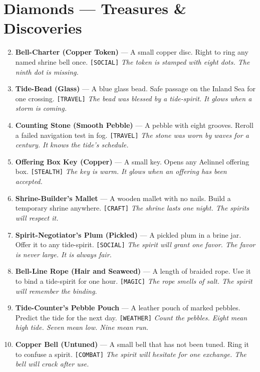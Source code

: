 \section*{Diamonds --- Treasures \& Discoveries}
\label{sec:aelinnel-rewards}
\begin{enumerate}
\setcounter{enumi}{1}
\item \textbf{Bell-Charter (Copper Token)} --- A small copper disc. Right to ring any named shrine bell once. \texttt{[SOCIAL]}
  \hfill \textit{The token is stamped with eight dots. The ninth dot is missing.}
\item \textbf{Tide-Bead (Glass)} --- A blue glass bead. Safe passage on the Inland Sea for one crossing. \texttt{[TRAVEL]}
  \hfill \textit{The bead was blessed by a tide-spirit. It glows when a storm is coming.}
\item \textbf{Counting Stone (Smooth Pebble)} --- A pebble with eight grooves. Reroll a failed navigation test in fog. \texttt{[TRAVEL]}
  \hfill \textit{The stone was worn by waves for a century. It knows the tide's schedule.}
\item \textbf{Offering Box Key (Copper)} --- A small key. Opens any Aelinnel offering box. \texttt{[STEALTH]}
  \hfill \textit{The key is warm. It glows when an offering has been accepted.}
\item \textbf{Shrine-Builder's Mallet} --- A wooden mallet with no nails. Build a temporary shrine anywhere. \texttt{[CRAFT]}
  \hfill \textit{The shrine lasts one night. The spirits will respect it.}
\item \textbf{Spirit-Negotiator's Plum (Pickled)} --- A pickled plum in a brine jar. Offer it to any tide-spirit. \texttt{[SOCIAL]}
  \hfill \textit{The spirit will grant one favor. The favor is never large. It is always fair.}
\item \textbf{Bell-Line Rope (Hair and Seaweed)} --- A length of braided rope. Use it to bind a tide-spirit for one hour. \texttt{[MAGIC]}
  \hfill \textit{The rope smells of salt. The spirit will remember the binding.}
\item \textbf{Tide-Counter's Pebble Pouch} --- A leather pouch of marked pebbles. Predict the tide for the next day. \texttt{[WEATHER]}
  \hfill \textit{Count the pebbles. Eight mean high tide. Seven mean low. Nine mean run.}
\item \textbf{Copper Bell (Untuned)} --- A small bell that has not been tuned. Ring it to confuse a spirit. \texttt{[COMBAT]}
  \hfill \textit{The spirit will hesitate for one exchange. The bell will crack after use.}

\end{enumerate}
